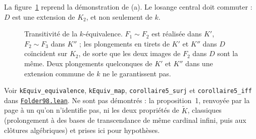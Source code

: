 La figure~\ref{fig:98-amalgame} reprend la démonstration de (a). Le losange central doit commuter : $D$ est une extension de $K_2$, et non seulement de $k$.

\begin{figure}[htbp]
\centering
{}
\caption{Transitivité de la $k$-équivalence. $F_1 \sim F_2$ est réalisée dans $K'$, $F_2 \sim F_3$ dans $K''$ ; les plongements en tirets de $K'$ et $K''$ dans $D$ coïncident sur $K_2$, de sorte que les deux images de $F_2$ dans $D$ sont la même. Deux plongements quelconques de $K'$ et $K''$ dans une extension commune de $k$ ne le garantissent pas.}
\label{fig:98-amalgame}
\end{figure}


\begin{sloppypar}\noindent Voir \texttt{kEquiv\_equivalence}, \texttt{kEquiv\_map}, \texttt{corollaire5\_surj} et \texttt{corollaire5\_iff} dans \href{\leanblob/CategoryTheory/Folder98.lean}{\texttt{Folder98.\allowbreak{}lean}}. Ne sont pas démontrés : la proposition~1, renvoyée par la page à un  qu'on n'identifie pas, ni les deux propriétés de $\widetilde K$, classiques (prolongement à des bases de transcendance de même cardinal infini, puis aux clôtures algébriques) et prises ici pour hypothèses.\end{sloppypar}
